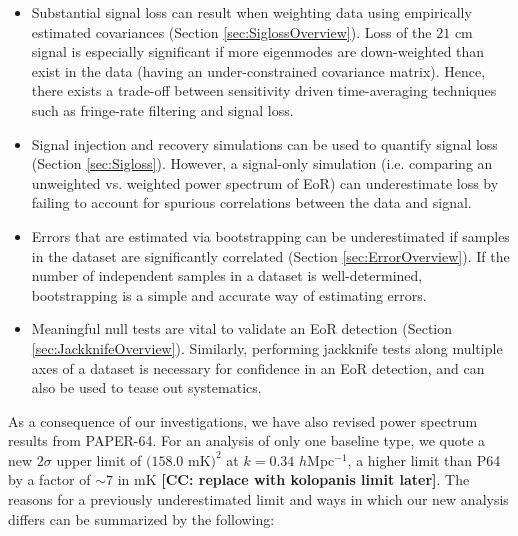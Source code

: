 \documentclass[preprint2,numberedappendix,tighten]{aastex6}  %
\newcommand{\cc}[1]{{\color{purple} \textbf{[CC: #1]}}}
\begin{document}
\begin{itemize}
\item Substantial signal loss can result when weighting data using empirically estimated covariances (Section \ref{sec:SiglossOverview}). Loss of the $21$ cm signal is especially significant if more eigenmodes are down-weighted than exist in the data (having an under-constrained covariance matrix). Hence, there exists a trade-off between sensitivity driven time-averaging techniques such as fringe-rate filtering and signal loss. 
\item Signal injection and recovery simulations can be used to quantify signal loss (Section \ref{sec:Sigloss}). However, a signal-only simulation (i.e. comparing an unweighted vs. weighted power spectrum of EoR) can underestimate loss by failing to account for spurious correlations between the data and signal.
\item Errors that are estimated via bootstrapping can be underestimated if samples in the dataset are significantly correlated (Section \ref{sec:ErrorOverview}). If the number of independent samples in a dataset is well-determined, bootstrapping is a simple and accurate way of estimating errors.
\item Meaningful null tests are vital to validate an EoR detection (Section \ref{sec:JackknifeOverview}). Similarly, performing jackknife tests along multiple axes of a dataset is necessary for confidence in an EoR detection, and can also be used to tease out systematics.
\end{itemize}

As a consequence of our investigations, we have also revised power spectrum results from PAPER-64. For an analysis of only one baseline type, we quote a new $2\sigma$ upper limit of $(158.0$ mK$)^{2}$ at $k=0.34$ $h$Mpc$^{-1}$, a higher limit than P64 by a factor of $\sim7$ in mK \cc{replace with kolopanis limit later}. The reasons for a previously underestimated limit and ways in which our new analysis differs can be summarized by the following:
\end{document}
